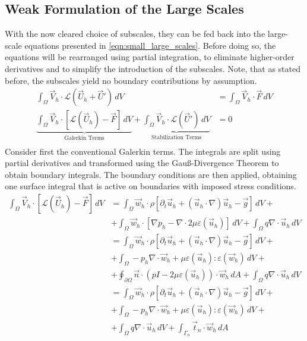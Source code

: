 \subsection{Weak Formulation of the Large Scales}
With the now cleared choice of subscales, they can be fed back into the large-scale equations presented in \autoref{eqn:small_large_scales}. Before doing so, the equations will be rearranged using partial integration, to eliminate higher-order derivatives and to simplify the introduction of the subscales. Note, that as stated before, the subscales yield no boundary contributions by assumption.
\begin{equation*}
	\begin{split}
		\int_{\Omega} \vec{V}_h \cdot \mathcal{L}(\vec{U}_h + \vec{U}') \,dV &= \int_{\Omega} \vec{V}_h \cdot \vec{F} \,dV \\[1em]
		\underbrace{\int_{\Omega} \vec{V}_h \cdot \left[\mathcal{L}(\vec{U}_h) - \vec{F}\right] \,dV}_{\text{Galerkin Terms}} + \underbrace{\int_{\Omega} \vec{V}_h \cdot \mathcal{L}(\vec{U}') \,dV}_{\text{Stabilization Terms}} &= 0 \\[1em]
	\end{split}
\end{equation*}
Consider first the conventional Galerkin terms. The integrals are split using partial derivatives and transformed using the Gau\ss-Divergence Theorem to obtain boundary integrals. The boundary conditions are then applied, obtaining one surface integral that is active on boundaries with imposed stress conditions.
\begin{equation*}
	\begin{split}
		\int_{\Omega} \vec{V}_h \cdot \left[\mathcal{L}(\vec{U}_h) - \vec{F}\right] \,dV &= \int_{\Omega} \vec{w}_h\cdot\rho\left[\partial_t \vec{u}_h + (\vec{u}_h\cdot\nabla)\vec{u}_h - \vec{g}\right]\,dV +\\ &+ \int_{\Omega}\vec{w}_h\cdot \left[\nabla p_h - \nabla\cdot2\mu\varepsilon(\vec{u}_h)\right]\,dV + \int_{\Omega} q\nabla\cdot\vec{u}_h \,dV\\
		&= \int_{\Omega} \vec{w}_h\cdot\rho\left[\partial_t \vec{u}_h + (\vec{u}_h\cdot\nabla)\vec{u}_h - \vec{g}\right] \,dV +\\ & + \int_{\Omega} -p_h\nabla\cdot\vec{w}_h + \mu\varepsilon(\vec{u}_h):\varepsilon(\vec{w}_h) \,dV + \\ &+ \oint_{\partial \Omega} \vec{n}\cdot \left(pI - 2\mu\varepsilon(\vec{u}_h)\right)\cdot\vec{w}_h \,dA + \int_{\Omega} q\nabla\cdot\vec{u}_h \,dV\\
		&= \int_{\Omega} \vec{w}_h\cdot\rho\left[\partial_t \vec{u}_h + (\vec{u}_h\cdot\nabla)\vec{u}_h - \vec{g}\right] \,dV +\\ &+ \int_{\Omega} -p_h\nabla\cdot\vec{w}_h + \mu\varepsilon(\vec{u}_h):\varepsilon(\vec{w}_h) \,dV +\\ &+ \int_{\Omega} q\nabla\cdot\vec{u}_h \,dV+ \int_{\Gamma_n} \vec{t}_{n}\cdot\vec{w}_h \,dA
	\end{split}
\end{equation*}
